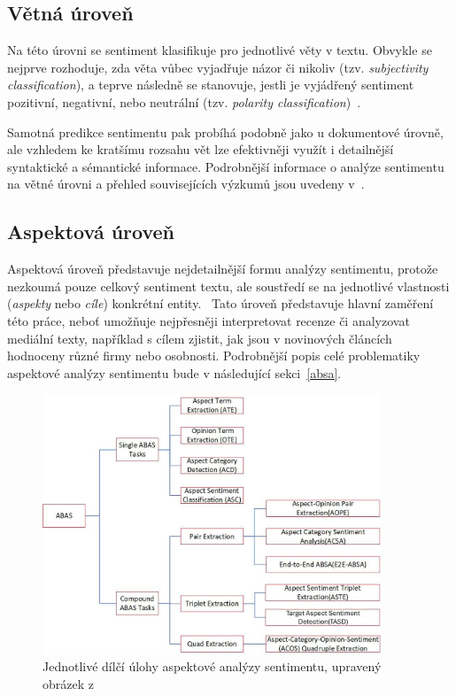 \subsection{Větná úroveň}
Na této úrovni se sentiment klasifikuje pro jednotlivé věty v textu. Obvykle se nejprve rozhoduje, zda věta vůbec vyjadřuje názor či nikoliv (tzv. \emph{subjectivity classification}), a teprve následně se stanovuje, jestli je vyjádřený sentiment pozitivní, negativní, nebo neutrální (tzv. \emph{polarity classification})~\cite{zhang2018deeplearningsentimentanalysis}.

Samotná predikce sentimentu pak probíhá podobně jako u dokumentové úrovně, ale vzhledem ke kratšímu rozsahu vět lze efektivněji využít i detailnější syntaktické a sémantické informace. Podrobnější informace o analýze sentimentu na větné úrovni a přehled souvisejících výzkumů jsou uvedeny v~\cite{zhang2018deeplearningsentimentanalysis}.

\subsection{Aspektová úroveň}
Aspektová úroveň představuje nejdetailnější formu analýzy sentimentu, protože nezkoumá pouze celkový sentiment textu, ale soustředí se na jednotlivé vlastnosti (\emph{aspekty} nebo \emph{cíle}) konkrétní entity.~\cite{zhang2018deeplearningsentimentanalysis} Tato úroveň představuje hlavní zaměření této práce, neboť umožňuje nejpřesněji interpretovat recenze či analyzovat mediální texty, například s cílem zjistit, jak jsou v novinových článcích hodnoceny různé firmy nebo osobnosti. Podrobnější popis celé problematiky aspektové analýzy sentimentu bude v následující sekci~\ref{absa}.

\begin{figure}[!htbp]
    \centering
    \includegraphics[width=0.9\textwidth]{images/absa}
    \caption[Jednotlivé dílčí úlohy aspektové analýzy sentimentu]%
    {Jednotlivé dílčí úlohy aspektové analýzy sentimentu, upravený obrázek z~\cite{MAO2024102048}}
    \label{fig:ABSA}
\end{figure}
